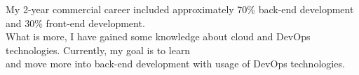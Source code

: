 
\par{
My 2-year commercial career included approximately 70\% back-end development and 30\% front-end development. \\
What is more, I have gained some knowledge about cloud and DevOps technologies. Currently, my goal is to learn \\
and move more into back-end development with usage of DevOps technologies.
}